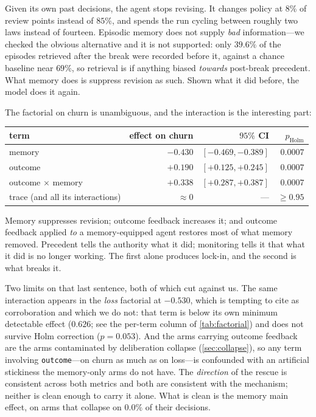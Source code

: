 \documentclass[11pt]{article}
\begin{document}
Given its own past decisions, the agent stops revising. It changes policy at $8\%$ of review points
instead of $85\%$, and spends the run cycling between roughly two laws instead of fourteen. Episodic
memory does not supply \emph{bad} information---we checked the obvious alternative and it is not
supported: only $39.6\%$ of the episodes retrieved after the break were recorded before it, against a
chance baseline near $69\%$, so retrieval is if anything biased \emph{towards} post-break precedent.
What memory does is suppress revision as such. Shown what it did before, the model does it again.

The factorial on churn is unambiguous, and the interaction is the interesting part:

\begin{center}\small
\begin{tabular}{@{}lrrr@{}}
\toprule
term & effect on churn & $95\%$ CI & $p_{\text{Holm}}$ \\
\midrule
memory & $-0.430$ & $[-0.469, -0.389]$ & $0.0007$ \\
outcome & $+0.190$ & $[+0.125, +0.245]$ & $0.0007$ \\
outcome $\times$ memory & $+0.338$ & $[+0.287, +0.387]$ & $0.0007$ \\
trace (and all its interactions) & $\approx 0$ & --- & $\geq 0.95$ \\
\bottomrule
\end{tabular}
\end{center}

Memory suppresses revision; outcome feedback increases it; and outcome feedback applied \emph{to} a
memory-equipped agent restores most of what memory removed. Precedent tells the authority what it
did; monitoring tells it that what it did is no longer working. The first alone produces lock-in, and
the second is what breaks it.

Two limits on that last sentence, both of which cut against us. The same interaction appears in the
\emph{loss} factorial at $-0.530$, which is tempting to cite as corroboration and which we do not:
that term is below its own minimum detectable effect ($0.626$; see the per-term column of
\cref{tab:factorial}) and does not survive Holm correction ($p=0.053$). And the arms carrying outcome
feedback are the arms contaminated by deliberation collapse (\cref{sec:collapse}), so any term
involving \texttt{outcome}---on churn as much as on loss---is confounded with an artificial
stickiness the memory-only arms do not have. The \emph{direction} of the rescue is consistent across
both metrics and both are consistent with the mechanism; neither is clean enough to carry it alone.
What is clean is the memory main effect, on arms that collapse on $0.0\%$ of their decisions.
\end{document}
